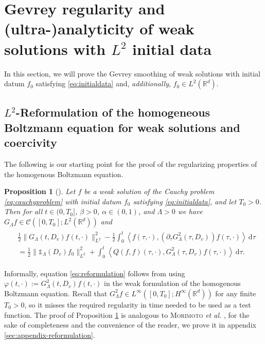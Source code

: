 \documentclass[11pt,a4paper,reqno]{amsart}
\theoremstyle{plain}
\newtheorem{proposition}{Proposition}[section]
\theoremstyle{definition}
\begin{document}
\section{Gevrey regularity and (ultra-)analyticity of weak solutions with $L^2$ initial data}\label{S2}
In this section, we will prove the Gevrey smoothing of weak solutions with
initial datum $f_0$ satisfying \eqref{eq:initialdata} and, \emph{additionally},  $f_0\in L^2({\mathbb{R}}^d)$.

\subsection{$L^2$-Reformulation of the homogeneous Boltzmann equation for weak solutions and coercivity}\label{sec:reform}
The following is our starting point for the proof of the regularizing properties of the homogenous Boltzmann equation.
\begin{proposition}[] \label{prop:L2reform}
	Let $f$ be a weak solution of the Cauchy problem \eqref{eq:cauchyproblem} with initial datum $f_0$ satisfying \eqref{eq:initialdata}, and let $T_0>0$. Then for all $t\in(0, T_0]$, $\beta>0$, $\alpha\in(0,1)$, and $\Lambda>0$ we have
$G_{\Lambda}f \in \mathcal{C}\left([0, T_0]; L^2({\mathbb{R}}^d)\right)$ and
	\begin{align}\label{eq:reformulation}
	\begin{split}
	&\frac{1}{2} \|G_{\Lambda}(t,D_v)f(t,\cdot)\|_{L^2}^2 - \frac{1}{2} \int_0^t \left\langle f(\tau, \cdot), \left( \partial_\tau G_{\Lambda}^2(\tau, D_v) \right) f(\tau,\cdot)\right\rangle \,\mathrm{d}\tau \\
	&= \frac{1}{2} \|{\mathds{1}}_{\Lambda}(D_v)f_0\|_{L^2}^2 + \int_0^t \left\langle Q(f,f)(\tau, \cdot), G_{\Lambda}^2(\tau, D_v)f(\tau, \cdot)\right\rangle \, \mathrm{d}\tau.
	\end{split}
	\end{align}
\end{proposition}
Informally, equation \eqref{eq:reformulation} follows from using $\varphi(t,\cdot):= G_{\Lambda}^2(t,D_v)f(t,\cdot)$  in the weak formulation of the homogenous Boltzmann equation.
Recall that $G_{\Lambda}^2f \in L^{\infty}([0, T_0]; H^{\infty}({\mathbb{R}}^d))$ for any finite $T_0>0$, so it misses the required regularity in time needed to be used as a test function. The proof of Proposition \ref{prop:L2reform} is analogous to \textsc{Morimoto} \textit{et al.} \cite{MUXY09}, for the sake of completeness and the convenience of the reader, we prove it in appendix \ref{sec:appendix-reformulation}.
\end{document}
